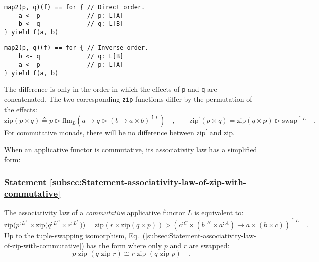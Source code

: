 \noindent %
\begin{minipage}[c][1\totalheight][t]{0.45\columnwidth}%
\begin{lstlisting}
map2(p, q)(f) == for { // Direct order.
    a <- p             // p: L[A]
    b <- q             // q: L[B]
} yield f(a, b)
\end{lstlisting}
%
\end{minipage}\hfill{}%
\begin{minipage}[c][1\totalheight][t]{0.45\columnwidth}%
\begin{lstlisting}
map2(p, q)(f) == for { // Inverse order.
    b <- q             // q: L[B]
    a <- p             // p: L[A]
} yield f(a, b)
\end{lstlisting}
%
\end{minipage}

\noindent The difference is only in the order in which the effects
of \lstinline!p! and \lstinline!q! are concatenated. The two corresponding
\lstinline!zip! functions differ by the permutation of the effects:
\[
\text{zip}\left(p\times q\right)\triangleq p\triangleright\text{flm}_{L}(a\rightarrow q\triangleright(b\rightarrow a\times b)^{\uparrow L})\quad,\quad\quad\text{zip}^{\prime}\left(p\times q\right)=\text{zip}\left(q\times p\right)\triangleright\text{swap}^{\uparrow L}\quad.
\]
For commutative monads, there will be no difference between $\text{zip}^{\prime}$
and $\text{zip}$. 

When an applicative functor is commutative, its associativity law
has a simplified form:

\subsubsection{Statement \label{subsec:Statement-associativity-law-of-zip-with-commutative}\ref{subsec:Statement-associativity-law-of-zip-with-commutative}}

The associativity law of a \emph{commutative} applicative functor
$L$ is equivalent to:
\begin{equation}
\text{zip}\big(p^{:L^{A}}\times\text{zip}\big(q^{:L^{B}}\times r^{:L^{C}}\big)\big)=\text{zip}\left(r\times\text{zip}\left(q\times p\right)\right)\triangleright(c^{:C}\times(b^{:B}\times a^{:A})\rightarrow a\times(b\times c))^{\uparrow L}\quad.\label{eq:associativity-law-of-zip-commutative}
\end{equation}
Up to the tuple-swapping isomorphism, Eq.~(\ref{subsec:Statement-associativity-law-of-zip-with-commutative})
has the form where only $p$ and $r$ are swapped:
\begin{equation}
p\,\,\text{zip}\,\,(q\,\,\text{zip}\,\,r)\cong r\,\,\text{zip}\,\,(q\,\,\text{zip}\,\,p)\quad.\label{eq:associativity-law-of-zip-commutative-short}
\end{equation}


